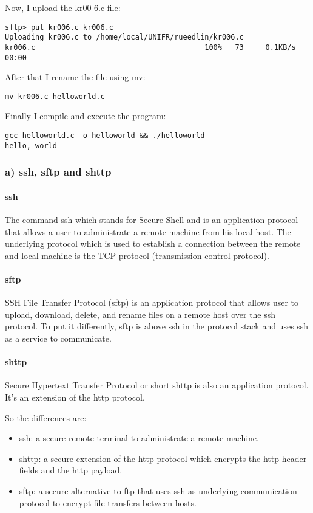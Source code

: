 \documentclass[12pt]{article}
\begin{document}
Now, I upload the kr00 6.c file:
\begin{lstlisting}
sftp> put kr006.c kr006.c 
Uploading kr006.c to /home/local/UNIFR/rueedlin/kr006.c
kr006.c                                       100%   73     0.1KB/s   00:00 
\end{lstlisting}

After that I rename the file using mv:
\begin{lstlisting}
mv kr006.c helloworld.c
\end{lstlisting}

Finally I compile and execute the program:
\begin{lstlisting}
gcc helloworld.c -o helloworld && ./helloworld 
hello, world
\end{lstlisting}

\subsubsection*{a) ssh, sftp and shttp}
\paragraph{ssh}
The command ssh which stands for Secure Shell and is an application protocol that allows a user to administrate a remote machine from his local host. The underlying protocol which is used to establish a connection between the remote and local machine is the TCP protocol (transmission control protocol).
 
\paragraph{sftp}
SSH File Transfer Protocol (sftp) is an application protocol that allows  user to upload, download, delete, and rename files on a remote host over the ssh protocol. To put it differently, sftp is above ssh in the protocol stack and uses ssh as a service to communicate.

\paragraph{shttp}
Secure Hypertext Transfer Protocol or short shttp is also an application protocol. It's an extension of the http protocol.

So the differences are:
\begin{itemize}
\item ssh: a secure remote terminal to administrate a remote machine.
\item shttp: a secure extension of the http protocol which encrypts the http header fields and the http payload.
\item sftp: a secure alternative to ftp that uses ssh as underlying communication protocol to encrypt file transfers between hosts.
\end{itemize}
\end{document}
